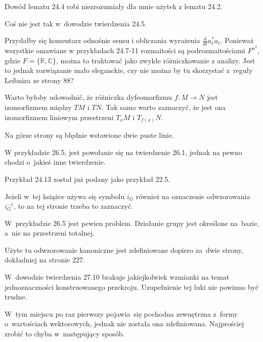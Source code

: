 \documentclass[a4paper,11pt]{article}
\begin{document}
\start {} Dowód lematu 24.4 robi niezrozumiały dla mnie użytek
z lematu 24.2.

\start {} Coś nie jest tak w~dowodzie twierdzenia 24.5.

\start {} Przydałby się komentarz odnośnie sensu i obliczania
wyrażenia $\frac{ d }{ dt } a^{ * }_{ t } a_{ t }$. Ponieważ wszystkie
omawiane w przykładach 24.7-11 rozmaitości są podrozmaitościami
$F^{ n^{ 2 } }$, gdzie $F = \{ \mathbb{ R }, \mathbb{ C } \}$, można
to traktować jako zwykłe różniczkowanie z analizy. Jest to jednak
rozwiązanie mało eleganckie, czy nie można by tu skorzystać z~reguły
Leibniza ze strony 88?

\start Warto byłoby udowodnić, że różniczka dyfeomorfizmu
$f : M \rightarrow N$ jest izomorfizmem między $TM$ i $TN$. Tak samo
warto zaznaczyć, że jest ona izomorfizmem liniowym przestrzeni
$T_{ x }M$ i $T_{ f( x ) }N$.

\start {} Na górze strony są błędnie wstawione dwie puste
linie.

\start {} W przykładzie 26.5, jest powołanie się na twierdzenie
26.1, jednak na pewno chodzi o~jakieś inne twierdzenie.

\start {} Przykład 24.13 został już podany jako przykład 22.5.

\start {} Jeżeli w~tej książce używa się symbolu $i_{ G }$
również na oznaczenie odwzorowania $i_{ G }^{ -1 }$, to na tej stronie
trzeba to zaznaczyć.

\start {} W~przykładzie 26.5 jest pewien problem. Działanie
grupy jest określone na~bazie, a~nie na przestrzeni totalnej.

\start {} Użyte tu odwzorowanie kanoniczne jest zdefiniowane
dopiero za~dwie strony, dokładniej na stronie 227.

\start {} W~dowodzie twierdzenia 27.10 brakuje jakiejkolwiek
wzmianki na temat jednoznaczności konstruowanego przekroju.
Uzupełnienie tej luki nie powinno być trudne.

\start {} W~tym miejscu po raz pierwszy pojawia~się pochodna
zewnętrzna z~formy o~wartościach wektorowych, jednak nie została ona
zdefiniowana. Najprościej zrobić to chyba w~następujący sposób.
\end{document}
